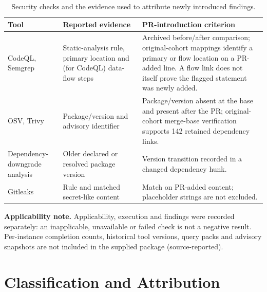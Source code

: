 \begin{table}[H]
\caption{Security checks and the evidence used to attribute newly introduced findings.}
\label{tab:scanners}
\footnotesize\renewcommand{\arraystretch}{1.13}
\begin{tabularx}{\linewidth}{@{}L{2.5cm}L{3.25cm}Y@{}}
\toprule
\textbf{Tool} & \textbf{Reported evidence} & \textbf{PR-introduction criterion}\\
\midrule
CodeQL, Semgrep & Static-analysis rule, primary location and (for CodeQL) data-flow steps & Archived before/after comparison; original-cohort mappings identify a primary or flow location on a PR-added line. A flow link does not itself prove the flagged statement was newly added.\\
OSV, Trivy & Package/version and advisory identifier & Package/version absent at the base and present after the PR; original-cohort merge-base verification supports 142 retained dependency links.\\
Dependency-downgrade analysis & Older declared or resolved package version & Version transition recorded in a changed dependency hunk.\\
Gitleaks & Rule and matched secret-like content & Match on PR-added content; placeholder strings are not excluded.\\
\bottomrule
\end{tabularx}
\par\smallskip\raggedright\scriptsize
\textbf{Applicability note.} Applicability, execution and findings were recorded separately: an inapplicable, unavailable or failed check is not a negative result. Per-instance completion counts, historical tool versions, query packs and advisory snapshots are not included in the supplied package (source-reported).
\end{table}

\FloatBarrier
\section{Classification and Attribution}\label{sec:s2}


